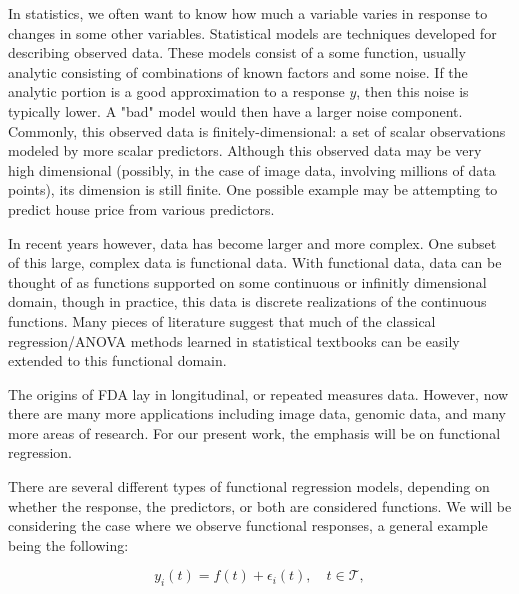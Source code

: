 In statistics, we often want to know how much a variable varies in response to changes in some other variables. 
Statistical models are techniques developed for describing observed data.  
These models consist of a some function, usually analytic consisting of combinations of known factors and some noise.  
If the analytic portion is a good approximation to a response \(y\), then this noise is typically lower.  
A "bad" model would then have a larger noise component.  
Commonly, this observed data is finitely-dimensional: a set of scalar observations modeled by more scalar predictors.  
Although this observed data may be very high dimensional (possibly, in the case of image data, involving millions of data points), its dimension is still finite.  
One possible example may be attempting to predict house price from various predictors\cite{de_cock_ames_2011}.

In recent years however, data has become larger and more complex.  
One subset of this large, complex data is functional data.  
With functional data, data can be thought of as functions supported on some continuous or infinitly dimensional domain, though in practice, this data is discrete realizations of the continuous functions.   
Many pieces of literature suggest that much of the classical regression/ANOVA methods learned in statistical textbooks can be easily extended to this functional domain.

The origins of FDA lay in longitudinal, or repeated measures data.  However, now there are many more applications including image data, genomic data, and many more areas of research\cite{morris_functional_2015}.  For our present work, the emphasis will be on functional regression.  

There are several different types of functional regression models, depending on whether the response, the predictors, or both are considered functions.  We will be considering the case where we observe functional responses, a general example being the following: 

\begin{equation}
    y_i(t) = f(t) + \epsilon_i(t), \quad t \in \mathcal{T},
\end{equation}